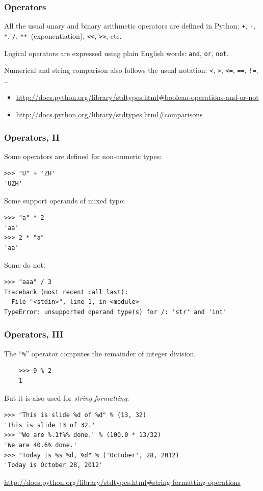\documentclass[english,serif,mathserif,xcolor=pdftex,dvipsnames,table]{beamer}
\begin{document}
\begin{frame}[fragile]
  \frametitle{Operators}
  All the usual unary and binary arithmetic operators are
  defined in Python: \texttt{+}, \texttt{-}, \texttt{*}, \texttt{/},
  \texttt{**}~(exponentiation), \texttt{<<}, \texttt{>>}, etc.

  \+
  Logical operators are expressed using plain English words:
  \texttt{and}, \texttt{or}, \texttt{not}.

  \+
  Numerical and string comparison also follows the usual notation:
  \texttt{<}, \texttt{>}, \texttt{<=}, \texttt{==}, \texttt{!=},
  \ldots

  \+
  \begin{references}
    \tiny
    \begin{itemize}
    \item
      \url{http://docs.python.org/library/stdtypes.html#boolean-operations-and-or-not}
    \item
      \url{http://docs.python.org/library/stdtypes.html#comparisons}
    \end{itemize}
  \end{references}
\end{frame}

\begin{frame}[fragile]
  \frametitle{Operators, II}
  Some operators are defined for non-numeric types:
\begin{lstlisting}
>>> "U" + 'ZH'
'UZH'
\end{lstlisting}

  \+
  Some support operands of mixed type:
\begin{lstlisting}
>>> "a" * 2
'aa'
>>> 2 * "a"
'aa'
\end{lstlisting}

  \+
  Some do not:
\begin{lstlisting}[basicstyle=\footnotesize\ttfamily]
>>> "aaa" / 3
Traceback (most recent call last):
  File "<stdin>", line 1, in <module>
TypeError: unsupported operand type(s) for /: 'str' and 'int'
\end{lstlisting}
\end{frame}


\begin{frame}[fragile]
  \frametitle{Operators, III}
  The ``\texttt{\%}'' operator computes the remainder of integer division.
  \begin{lstlisting}
    >>> 9 % 2
    1
  \end{lstlisting}

  \+
  But it is also used for \emph{string formatting}:
\begin{lstlisting}[showstringspaces=false]
>>> "This is slide %d of %d" % (13, 32)
'This is slide 13 of 32.'
>>> "We are %.1f%% done." % (100.0 * 13/32)
'We are 40.6% done.'
>>> "Today is %s %d, %d" % ('October', 28, 2012)
'Today is October 28, 2012'
\end{lstlisting}

  \begin{references}
    \url{http://docs.python.org/library/stdtypes.html#string-formatting-operations}
  \end{references}
\end{frame}
\end{document}
